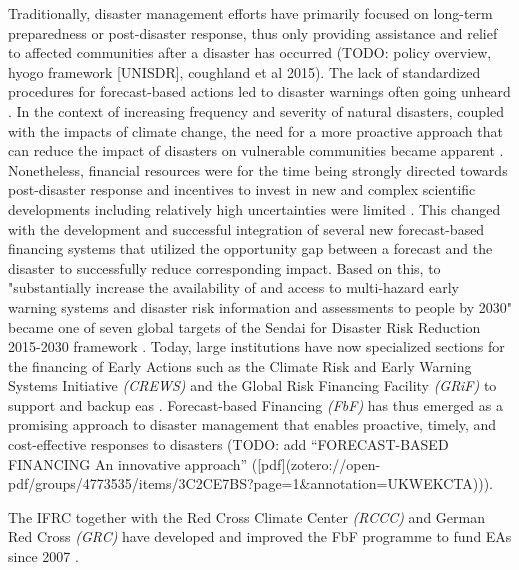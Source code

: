 {Traditionally, disaster management efforts have primarily focused on long-term preparedness or post-disaster response, thus only providing assistance and relief to affected communities after a disaster has occurred (TODO: policy overview, hyogo framework [UNISDR], coughland et al 2015). The lack of standardized procedures for forecast-based actions led to disaster warnings often going unheard \autocite{kolenImpactsStormXynthia2013}. In the context of increasing frequency and severity of natural disasters, coupled with the impacts of climate change, the need for a more proactive approach that can reduce the impact of disasters on vulnerable communities became apparent \autocite{coughlandeperezForecastbasedFinancingApproach2015,trisosAfrica2022}. Nonetheless, financial resources were for the time being strongly directed towards post-disaster response and incentives to invest in new and complex scientific developments including relatively high uncertainties were limited \autocite{coughlandeperezActionbasedFloodForecasting2016}. This changed with the development and successful integration of several new forecast-based financing systems that utilized the opportunity gap between a forecast and the disaster to successfully reduce corresponding impact. Based on this, to "substantially increase the availability of and access to multi-hazard early warning systems and disaster risk information and assessments to people by 2030" became one of seven global targets of the Sendai for Disaster Risk Reduction 2015-2030 framework \autocites{coughlandeperezActionbasedFloodForecasting2016}[12]{undrrSendaiFrameworkDisaster}. Today, large institutions have now specialized sections for the financing of Early Actions such as the Climate Risk and Early Warning Systems Initiative \textit{(CREWS)} and the Global Risk Financing Facility \textit{(GRiF)} to support and backup \acfp{ea} \autocite{crewsClimateRiskEarly,GlobalRiskFinancing}. Forecast-based Financing \textit{(FbF)} has thus emerged as a promising approach to disaster management that enables proactive, timely, and cost-effective responses to disasters \autocite{coughlandeperezForecastbasedFinancingApproach2015} (TODO: add “FORECAST-BASED FINANCING An innovative approach” ([pdf](zotero://open-pdf/groups/4773535/items/3C2CE7BS?page=1&annotation=UKWEKCTA))).

The IFRC together with the Red Cross Climate Center \textit{(RCCC)} and German Red Cross \textit{(GRC)} have developed and improved the FbF programme to fund EAs since 2007 \autocite{ifrcForecastbasedFinancingNew2019}. 

}
